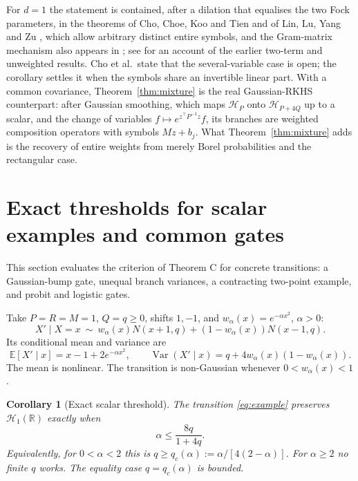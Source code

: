 \documentclass[11pt,a4paper]{article}
\newtheorem{corollary}[theorem]{Corollary}
\theoremstyle{remark}
\newcommand{\R}{\mathbb R}
\newcommand{\E}{\mathbb E}
\newcommand{\HH}{\mathcal H}
\begin{document}
For $d=1$ the statement is contained, after a dilation that equalises
the two Fock parameters, in the theorems of Cho, Choe, Koo
and Tien \cite[Theorem~1.1]{CCKT2026} and of Lin, Lu, Yang and Zu
\cite[Theorem~1.1]{LLYZ2026}, which allow arbitrary distinct entire
symbols, and the Gram-matrix mechanism also appears in \cite{CCKT2026};
see \cite{CCKT2026} for an account of the earlier two-term and
unweighted results.
Cho et al.\ state that the several-variable case is open; the corollary
settles it when the symbols share an invertible linear part. With a
common covariance, Theorem~\ref{thm:mixture} is the real Gaussian-RKHS
counterpart: after Gaussian smoothing, which maps $\HH_P$ onto
$\HH_{P+4Q}$ up to a scalar, and the change of variables
$f\mapsto e^{z^\top P^{-1}z}f$, its branches are weighted composition
operators with symbols $Mz+b_j$. What Theorem~\ref{thm:mixture} adds is
the recovery of entire weights from merely Borel probabilities and the
rectangular case.



\section{Exact thresholds for scalar examples and common gates}\label{sec:example}

This section evaluates the criterion of Theorem C for concrete
transitions: a Gaussian-bump gate, unequal branch variances, a
contracting two-point example, and probit and logistic gates.

Take $P=R=M=1$, $Q=q\ge0$, shifts $1,-1$, and
$w_\alpha(x)=e^{-\alpha x^2}$, $\alpha>0$:
\begin{equation}\label{eq:example}
 X'\mid X=x\ \sim\
 w_\alpha(x)N(x+1,q)
       +(1-w_\alpha(x))N(x-1,q).
\end{equation}
Its conditional mean and variance are
\[
 \E[X'\mid x]=x-1+2e^{-\alpha x^2},
 \qquad
 \operatorname{Var}(X'\mid x)=q+4w_\alpha(x)(1-w_\alpha(x)).
\]
The mean is nonlinear. The transition is non-Gaussian whenever
$0<w_\alpha(x)<1$.

\begin{corollary}[Exact scalar threshold]\label{cor:threshold}
The transition \eqref{eq:example} preserves $\HH_1(\R)$ exactly when
\begin{equation}\label{eq:threshold}
 \alpha\le\frac{8q}{1+4q}.
\end{equation}
Equivalently, for $0<\alpha<2$ this is
$q\ge q_c(\alpha):=\alpha/[4(2-\alpha)]$.
For $\alpha\ge2$ no finite $q$ works.
The equality case $q=q_c(\alpha)$ is bounded.
\end{corollary}
\end{document}
